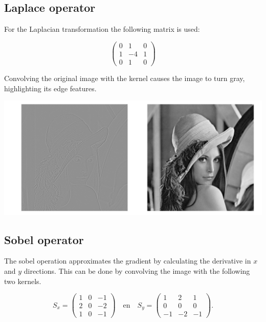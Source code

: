 \documentclass[a4paper,12px]{article}
\begin{document}
\subsection{Laplace operator}

For the Laplacian transformation the following matrix is used:

$$\left(\begin{array}{ccc} 0 & 1 & 0 \\ 1 & -4 & 1 \\ 0 & 1 & 0
\end{array}\right)$$

Convolving the original image with the kernel causes the image to turn gray,
highlighting its edge features.

\begin{center}
    \includegraphics[width=\textwidth]{laplace}
\end{center}

\subsection{Sobel operator}

The sobel operation approximates the gradient by calculating the derivative in
$x$ and $y$ directions. This can be done by convolving the image with the
following two kernels.

$$ S_x=\left(\begin{array}{ccc} 1 & 0 & -1 \\ 2 & 0 & -2 \\ 1 & 0 & -1
\end{array}\right) \quad\mathrm{en}\quad S_y=\left(\begin{array}{ccc} 1 & 2 & 1
\\ 0 & 0 & 0 \\ -1 & -2 & -1 \end{array}\right). $$
\end{document}
